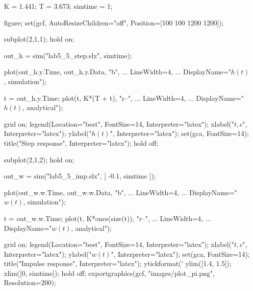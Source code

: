 
\begin{matlabcode}
K = 1.441;
T = 3.673;
simtime = 1;

figure;
set(gcf, AutoResizeChildren="off", Position=[100 100 1200 1200]);

subplot(2,1,1);
hold on;

out_h = sim("lab5_5_step.slx", simtime);

plot(out_h.y.Time, out_h.y.Data, "b", ...
     LineWidth=4, ...
     DisplayName="$h(t)$, simulation");

t = out_h.y.Time;
plot(t, K*(T + t), "r--", ...
     LineWidth=4, ...
     DisplayName="$h(t)$, analytical");

grid on;
legend(Location="best", FontSize=14, Interpreter="latex");
xlabel("$t, c$", Interpreter="latex");
ylabel("$h(t)$", Interpreter="latex");
set(gca, FontSize=14);
title("Step response", Interpreter="latex");
hold off;

subplot(2,1,2);
hold on;

out_w = sim("lab5_5_imp.slx", [ -0.1, simtime ]);

plot(out_w.w.Time, out_w.w.Data, "b", ...
     LineWidth=4, ...
     DisplayName="$w(t)$, simulation");

t = out_w.w.Time;
plot(t, K*ones(size(t)), "r--", ...
     LineWidth=4, ...
     DisplayName="$w(t)$, analytical");

grid on;
legend(Location="best", FontSize=14, Interpreter="latex");
xlabel("$t, c$", Interpreter="latex");
ylabel("$w(t)$", Interpreter="latex");
set(gca, FontSize=14);
title("Impulse response", Interpreter="latex");
ytickformat('%
ylim([1.4, 1.5]);
xlim([0, simtime]);
hold off;
exportgraphics(gcf, "images/plot_pi.png", Resolution=200);
\end{matlabcode}


